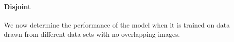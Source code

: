 \paragraph{Disjoint}\label{sec:baseline_results:disjoint}

\begin{comment}
\begin{table}
    \centering
    \renewcommand{\arraystretch}{1.0}
    \begin{tabular}{lccc}
        \toprule
         & \multicolumn{3}{c}{English}\\
         & I $\rightarrow$ T & T $\rightarrow$ I & Sum\\
         \midrule
          COCO & 34.4 & 24.8 & 304.0 \\
         En & 40.5 & 28.8 & 346.4 \\
         \; + COCO & \textbf{46.2} & \textbf{33.4} & \textbf{374.4}\\
         \bottomrule
    \end{tabular}
     \caption{Measuring \emph{domain shift} by testing models trained on
     COCO (COCO), M30K English (En) and both (+COCO) on
     the English M30K 2016 test set.}
    \label{tab:engdisjoint}
\end{table}
\end{comment}



We now determine the performance of the model when it is trained on data drawn from different data sets with no overlapping images.

